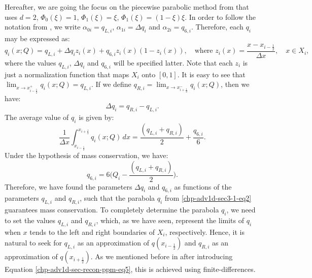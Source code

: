 Hereafter, we are going the focus on the piecewise parabolic method from \citet{colella:1984} that uses $d=2$, 
$\Phi_0(\xi)=1$, $\Phi_1(\xi)=\xi$, $\Phi_1(\xi)=(1-\xi)\xi$. 
In order to follow the notation from \citet{colella:1984},
we write $\alpha_{0i} = q_{L, i}$, $\alpha_{1i} = \Delta q_i$ and $\alpha_{2i} = q_{6, i}$.
Therefore, each $q_i$ may be expressed as:
\begin{equation}
	\label{chp-adv1d-sec-recon-ppm-eq1}
	q_i(x;Q) = q_{L, i} + \Delta q_i z_i(x) + q_{6, i}z_i(x)(1-z_i(x)), 
	\quad \text{where }
	z_i(x) = \frac{x-x_{i-\frac{1}{2}}}{\Delta x},
	\quad x \in X_i,
\end{equation}
where the values $q_{L, i}$, $\Delta q_i$ and $q_{6, i}$  will be specified latter.
Note that each $z_i$ is just a normalization function that maps $X_i$ onto $[0,1]$.
It is easy to see that 
$\lim_{x \to x_{i-\frac{1}{2}}^+} {q_i(x;Q)} = q_{L, i}$.
If we define $q_{R, i} = \lim_{x \to x_{i+\frac{1}{2}}^-} {q_i(x;Q)}$,
then we have:
\begin{equation}
	\label{chp-adv1d-sec-recon-ppm-eq2}
	\Delta q_i = q_{R, i} - q_{L, i}.
\end{equation}
The average value of $q_i$ is given by:
\begin{equation}
	\label{chp-adv1d-sec-recon-ppm-eq3}
	\frac{1}{\Delta x}\int_{x_{i-\frac{1}{2}}}^{x_{i+\frac{1}{2}}} {q}_i(x;Q) \,dx
	= \frac{(q_{L,i} + q_{R,i})}{2} + \frac{q_{6,i}}{6}.
\end{equation}
Under the hypothesis of mass conservation, we have:
\begin{equation}
	\label{chp-adv1d-sec-recon-ppm-eq4}
	q_{6,i} = 6\bigg(Q_i - \frac{(q_{L,i} + q_{R,i})}{2}\bigg).
\end{equation}
Therefore, we have found the parameters $\Delta q_i$ and $q_{6, i}$ as
functions of the parameters $q_{L, i}$ and $q_{R, i}$,
such that the parabola $q_i$ from \eqref{chp-adv1d-sec3-1-eq2} 
guarantees mass conservation. To completely determine the 
parabola $q_i$, we need to set the values $q_{L, i}$ and
$q_{R, i}$, which, as we have seen, represent the limits of $q_i$ when
$x$ tends to the left and right boundaries of $X_i$, respectively.
Hence, it is natural to seek for $q_{L, i}$ as an approximation of $q(x_{i-\frac{1}{2}})$
and $q_{R, i}$ as an approximation of $q(x_{i+\frac{1}{2}})$.
As we mentioned before in after introducing Equation \eqref{chp-adv1d-sec-recon-ppm-eq5}, this is achieved
using finite-differences.

